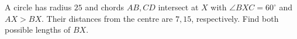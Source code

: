 A circle has radius $25$ and chords $AB,CD$ intersect at $X$ with $\angle BXC=60^\circ$ and $AX>BX$. Their distances from the centre are $7,15$, respectively. Find both possible lengths of $BX$.
